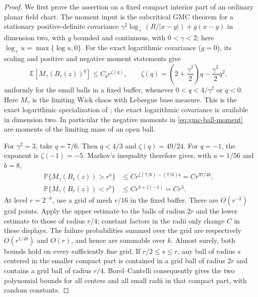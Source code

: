\begin{proof}
We first prove the assertion on a fixed compact interior part of an
ordinary planar field chart.  The moment input is the subcritical GMC
theorem for a stationary positive-definite covariance
$\gamma^2\log_+(R/|x-y|)+g(x-y)$ in dimension two, with $g$ bounded and
continuous, with $0<\gamma<2$; here $\log_+u=\max\{\log u,0\}$.  For the
exact logarithmic covariance ($g=0$), its scaling
and positive and negative moment statements give
\begin{equation}\label{eq:gmc-ball-moment}
 \mathbb E[M_\gamma(B_r(z))^q]\le C_q r^{\zeta(q)},\qquad
 \zeta(q)=\left(2+\frac{\gamma^2}{2}\right)q
                    -\frac{\gamma^2}{2}q^2,
\end{equation}
uniformly for the small balls in a fixed buffer, whenever
$0<q<4/\gamma^2$ or $q<0$.  Here $M_\gamma$ is the limiting Wick chaos
with Lebesgue base measure.  This is the exact logarithmic specialization of
\cite[Propositions~3.3 and~3.5--3.7]{RobertVargas2010GMC}; the exact
logarithmic covariance is available in dimension two.  In particular the
negative moments in \eqref{eq:gmc-ball-moment} are moments of the limiting
mass of an open ball.

For $\gamma^2=3$, take $q=7/6$.  Then $q<4/3$ and $\zeta(q)=49/24$.
For $q=-1$, the exponent is $\zeta(-1)=-5$.  Markov's inequality
therefore gives, with $a=1/56$ and $b=8$,
\begin{align}
 \mathbb P\{M_\gamma(B_r(z))>r^a\}
       &\le C r^{\zeta(7/6)-(7/6)a}=C r^{97/48},
       \label{eq:gmc-upper-prob}\\
 \mathbb P\{M_\gamma(B_r(z))<r^b\}
       &\le C r^{b+\zeta(-1)}=C r^3.
       \label{eq:gmc-lower-prob}
\end{align}
At level $r=2^{-k}$, use a grid of mesh $r/16$ in the fixed buffer.
There are $O(r^{-2})$ grid points.  Apply the upper estimate to the
balls of radius $2r$ and the lower estimate to those of radius $r/4$;
constant factors in the radii only change $C$ in these displays.  The
failure probabilities summed over the grid are respectively
$O(r^{1/48})$ and $O(r)$, and hence are summable over $k$.  Almost surely,
both bounds hold on every sufficiently fine grid.  If
$r/2\le s\le r$, any ball of radius $s$ centered in the smaller compact
part is contained in a grid ball of radius $2r$ and contains a grid ball
of radius $r/4$.  Borel--Cantelli consequently gives the two polynomial
bounds for all centers and all small radii in that compact part, with
random constants.


\end{proof}
